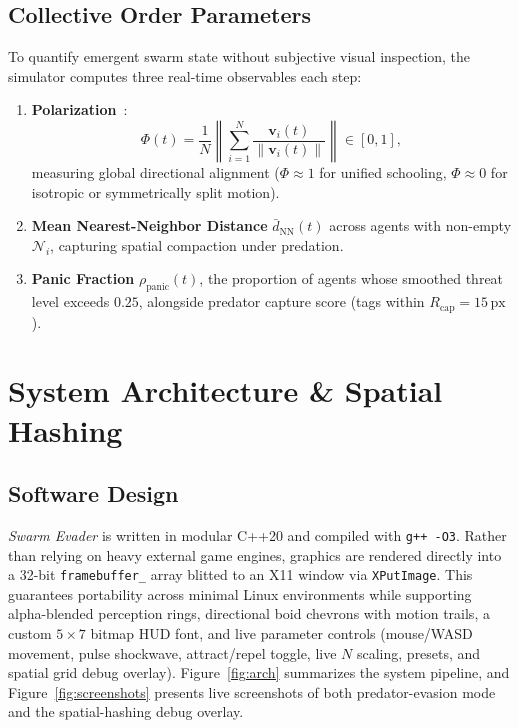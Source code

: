 \documentclass[10pt,twocolumn]{article}
\begin{document}
\subsection{Collective Order Parameters}
To quantify emergent swarm state without subjective visual inspection, the simulator computes three real-time observables each step:
\begin{enumerate}
    \item \textbf{Polarization}~\cite{vicsek1995novel,couzin2002collective}:
    \begin{equation}
        \Phi(t) = \frac{1}{N} \left\| \sum_{i=1}^N \frac{\mathbf{v}_i(t)}{\|\mathbf{v}_i(t)\|} \right\| \in [0, 1],
    \end{equation}
    measuring global directional alignment ($\Phi \approx 1$ for unified schooling, $\Phi \approx 0$ for isotropic or symmetrically split motion).
    \item \textbf{Mean Nearest-Neighbor Distance} $\bar{d}_{\text{NN}}(t)$ across agents with non-empty $\mathcal{N}_i$, capturing spatial compaction under predation.
    \item \textbf{Panic Fraction} $\rho_{\text{panic}}(t)$, the proportion of agents whose smoothed threat level exceeds $0.25$, alongside predator capture score (tags within $R_{\text{cap}} = 15\,\text{px}$).
\end{enumerate}

\section{System Architecture \& Spatial Hashing}

\subsection{Software Design}
\emph{Swarm Evader} is written in modular C++20 and compiled with \texttt{g++ -O3}. Rather than relying on heavy external game engines, graphics are rendered directly into a 32-bit \texttt{framebuffer\_} array blitted to an X11 window via \texttt{XPutImage}. This guarantees portability across minimal Linux environments while supporting alpha-blended perception rings, directional boid chevrons with motion trails, a custom $5\times 7$ bitmap HUD font, and live parameter controls (mouse/WASD movement, pulse shockwave, attract/repel toggle, live $N$ scaling, presets, and spatial grid debug overlay). Figure~\ref{fig:arch} summarizes the system pipeline, and Figure~\ref{fig:screenshots} presents live screenshots of both predator-evasion mode and the spatial-hashing debug overlay.
\end{document}
